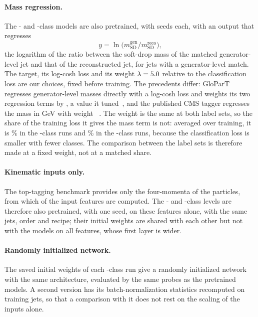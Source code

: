 \documentclass[11pt]{article}
\newcommand{\Kfull}{\VocabSizeLoneeighteight}
\newcommand{\Kres}{\VocabSizeLonesixtwo}
\newcommand{\Kcoarse}{\VocabSizeRonesixQone}
\begin{document}
\paragraph{Mass regression.} The \Kres- and \Kcoarse-class models are also pretrained, with
\MlstMassNRunsWord{} seeds each, with an output that regresses
\begin{equation}\label{eq:masstarget}
  y = \ln\bigl(m_{\mathrm{SD}}^{\mathrm{gen}} / m_{\mathrm{SD}}^{\mathrm{reco}}\bigr),
\end{equation}
the logarithm of the ratio between the soft-drop mass of the matched generator-level jet and that
of the reconstructed jet, for jets with a generator-level match. The target, its log-cosh loss and
its weight $\lambda = 5.0$ relative to the classification loss are our choices, fixed
before training. The precedents differ: GloParT regresses generator-level masses directly with a
log-cosh loss and weights its two regression terms by \LitGlopartMassLambda, a value it
tuned~\cite[Eqs.~(11.2)--(11.7)]{glopart}, and the published CMS tagger regresses the mass in GeV
with weight \LitCmsPartMassLambda~\cite{cmspart}. The weight is the same at both label sets, so the
share of the training loss it gives the mass term is not: averaged over training, it is
\MlstMassLossShareResMass\% in the \Kres-class runs and \MlstMassLossShareCoarseMass\% in the
\Kcoarse-class runs, because the classification loss is smaller with fewer classes. The comparison
between the label sets is therefore made at a fixed weight, not at a matched share.

\paragraph{Kinematic inputs only.} The top-tagging benchmark provides only the four-momenta of the
particles, from which \FillTopNPresent{} of the \FillNFeatures{} input features are computed. The
\Kfull- and \Kcoarse-class levels are therefore also pretrained, with one seed, on these features
alone, with the same jets, order and recipe; their initial weights are shared with each other but
not with the models on all features, whose first layer is wider.

\paragraph{Randomly initialized network.} The saved initial weights of each \Kfull-class run give a
randomly initialized network with the same architecture, evaluated by the same probes as the
pretrained models. A second version has its batch-normalization statistics recomputed on training
jets, so that a comparison with it does not rest on the scaling of the inputs alone.
\end{document}
